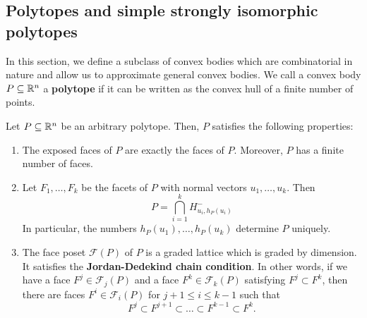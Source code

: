\documentclass{puthesis-UG}
\begin{document}
\subsection{Polytopes and simple strongly isomorphic polytopes }

In this section, we define a subclass of convex bodies which are combinatorial in nature and allow us to approximate general convex bodies. We call a convex body $P \subseteq \mathbb{R}^n$ a \textbf{polytope} if it can be written as the convex hull of a finite number of points. 

\begin{prop}
	Let $P \subseteq \mathbb{R}^n$ be an arbitrary polytope. Then, $P$ satisfies the following properties: 
	\begin{enumerate}[label = (\alph*)]
		\item The exposed faces of $P$ are exactly the faces of $P$. Moreover, $P$ has a finite number of faces. 
		\item Let $F_1, \ldots, F_k$ be the facets of $P$ with normal vectors $u_1, \ldots, u_k$. Then 
		\[
			P = \bigcap_{i = 1}^k H_{u_i, h_P(u_i)}^-
		\]
		In particular, the numbers $h_P(u_1), \ldots, h_P(u_k)$ determine $P$ uniquely. 

		\item The face poset $\mathcal{F}(P)$ of $P$ is a graded lattice which is graded by dimension. It satisfies the \textbf{Jordan-Dedekind chain condition}. In other words, if we have a face $F^j \in \mathcal{F}_j(P)$ and a face $F^k \in \mathcal{F}_k(P)$ satisfying $F^j \subset F^k$, then there are faces $F^i \in \mathcal{F}_i(P)$ for $j+1 \leq i \leq k-1$ such that 
		\[
			F^j \subset F^{j+1} \subset \ldots \subset F^{k-1} \subset F^k.
		\]
	\end{enumerate}
\end{prop}
\end{document}

